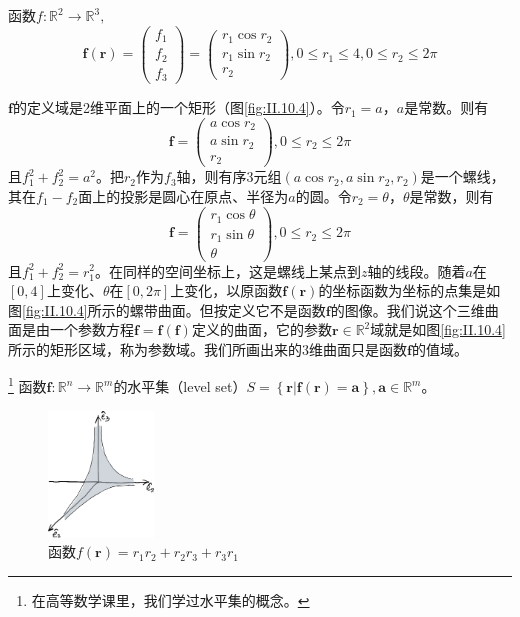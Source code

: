 \documentclass[main.tex]{subfiles}
\begin{document}
\begin{example}
函数$f:\mathbb{R}^2\rightarrow\mathbb{R}^3,$
\[
\mathbf{f}\left(\mathbf{r}\right)=\left(\begin{array}{c}f_1\\f_2\\f_3\end{array}\right)=\left(\begin{array}{c}r_1\cos r_2\\r_1\sin r_2\\r_2\end{array}\right),0\leq r_1\leq 4,0\leq r_2\leq 2\pi
\]

$\mathbf{f}$的定义域是2维平面上的一个矩形（图\ref{fig:II.10.4}）。令$r_1=a$，$a$是常数。则有
\[
\mathbf{f}=\left(\begin{array}{c}
    a\cos r_2\\
    a\sin r_2\\
    r_2
    \end{array}\right),0\leq r_2\leq 2\pi
\]
且$f_1^2+f_2^2=a^2$。把$r_2$作为$f_3$轴，则有序3元组$\left(a\cos r_2,a\sin r_2,r_2\right)$是一个螺线，其在$f_1-f_2$面上的投影是圆心在原点、半径为$a$的圆。令$r_2=\theta$，$\theta$是常数，则有
\[
\mathbf{f}=\left(\begin{array}{c}
    r_1\cos \theta\\
    r_1\sin \theta\\
    \theta
    \end{array}\right),0\leq r_2\leq 2\pi
\]
且$f_1^2+f_2^2=r_1^2$。在同样的空间坐标上，这是螺线上某点到$z$轴的线段。随着$a$在$\left[0,4\right]$上变化、$\theta$在$\left[0,2\pi\right]$上变化，以原函数$\mathbf{f}\left(\mathbf{r}\right)$的坐标函数为坐标的点集是如图\ref{fig:II.10.4}所示的螺带曲面。但按定义它不是函数$\mathbf{f}$的图像。我们说这个三维曲面是由一个参数方程$\mathbf{f}=\mathbf{f}\left(\mathbf{f}\right)$定义的曲面，它的参数$\mathbf{r}\in\mathbb{R}^2$域就是如图\ref{fig:II.10.4}所示的矩形区域，称为参数域。我们所画出来的3维曲面只是函数$\mathbf{f}$的值域。
\end{example}

\begin{definition}[函数的水平集]\footnote{在高等数学课里，我们学过水平集的概念\cite[\S7.1,p~1] {华工高数2009下}。}
函数$\mathbf{f}:\mathbb{R}^n\rightarrow\mathbb{R}^m$的水平集（level set）$S=\left\{\mathbf{r}|\mathbf{f}\left(\mathbf{r}\right)=\mathbf{a}\right\},\mathbf{a}\in\mathbb{R}^m$。
\end{definition}

\begin{figure}[h]
    \centering
    \includegraphics[width=0.25\textwidth]{images/II.10.5.eps}
    \caption{函数$f\left(\mathbf{r}\right)=r_1r_2+r_2r_3+r_3r_1$}
    \label{fig:II.10.5}
\end{figure}
\end{document}
